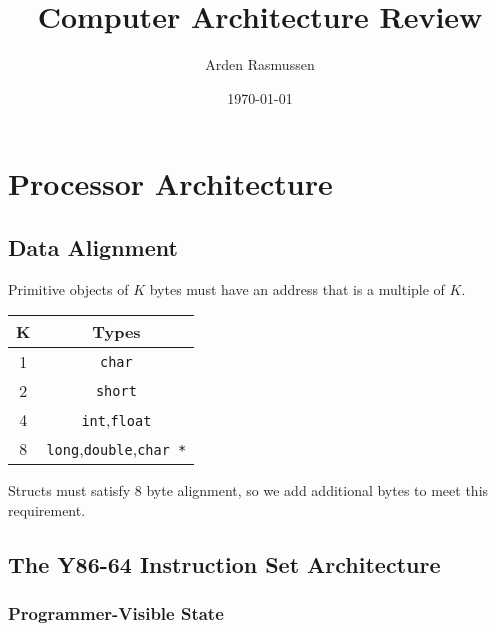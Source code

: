 \documentclass[10pt]{armath}
\title{Computer Architecture Review}
\author{Arden Rasmussen}
\date{\today}
\newcommand{\s}[1]{\texttt{#1}}
\begin{document}
\maketitle

\section{Processor Architecture}%
\label{sec:processor_architecture}

\subsection{Data Alignment}%
\label{sub:data_alignment}

Primitive objects of $K$ bytes must have an address that is a multiple of $K$.
\begin{center}
  \begin{tabular}{c c}
    K & Types\\\hline
    1 & \s{char}\\
    2 & \s{short}\\
    4 & \s{int},\s{float}\\
    8 & \s{long},\s{double},\s{char *}\\\hline
  \end{tabular}
\end{center}

Structs must satisfy $8$ byte alignment, so we add additional bytes to meet
this requirement.

\subsection{The Y86-64 Instruction Set Architecture}%
\label{sub:the_y86_64_instruction_set_architecture}

\subsubsection{Programmer-Visible State}%
\label{ssub:programmer_visible_state}
\end{document}
